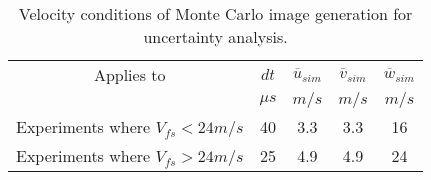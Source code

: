 \begin{table}[H]
\begin{center}
\begin{tabular}{|ccccc|}
	\hline
	Applies to & $dt$ & $\overline{u}_{sim}$ & $\overline{v}_{sim}$ & $\overline{w}_{sim}$\\
	  & $\mu s$ & $m/s$ & $m/s$ & $m/s$\\
	\hline
	Experiments where $V_{fs} < 24 m/s$ & 40 & 3.3 & 3.3 & 16\\
	Experiments where $V_{fs} > 24 m/s$ & 25 & 4.9 & 4.9 & 24\\
	\hline
\end{tabular}
\caption{Velocity conditions of Monte Carlo image generation for uncertainty analysis.}
\label{table:uncertainty_sim_table}
\end{center}
\end{table}
